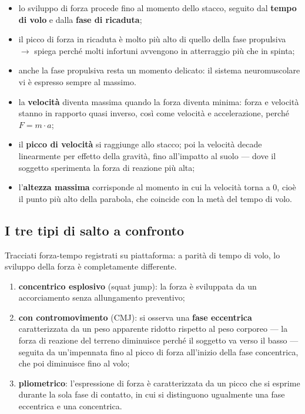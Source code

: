 \begin{itemize}
  \item lo sviluppo di forza procede fino al momento dello stacco, seguito dal \textbf{tempo di
    volo} e dalla \textbf{fase di ricaduta};
  \item il picco di forza in ricaduta è molto più alto di quello della fase propulsiva $\rightarrow$
    spiega perché molti infortuni avvengono in atterraggio più che in spinta;
  \item anche la fase propulsiva resta un momento delicato: il sistema neuromuscolare vi è espresso
    sempre al massimo.
\end{itemize}

\begin{itemize}
  \item la \textbf{velocità} diventa massima quando la forza diventa minima: forza e velocità stanno
    in rapporto quasi inverso, così come velocità e accelerazione, perché $F = m \cdot a$;
  \item il \textbf{picco di velocità} si raggiunge allo stacco; poi la velocità decade linearmente
    per effetto della gravità, fino all'impatto al suolo --- dove il soggetto sperimenta la forza di
    reazione più alta;
  \item l'\textbf{altezza massima} corrisponde al momento in cui la velocità torna a $0$, cioè il
    punto più alto della parabola, che coincide con la metà del tempo di volo.
\end{itemize}

\subsection{I tre tipi di salto a confronto}

Tracciati forza-tempo registrati su piattaforma: a parità di tempo di volo, lo sviluppo della forza
è completamente differente.

\begin{enumerate}
  \item \textbf{concentrico esplosivo} (squat jump): la forza è sviluppata da un accorciamento senza
    allungamento preventivo;
  \item \textbf{con contromovimento} (CMJ): si osserva una \textbf{fase eccentrica} caratterizzata
    da un peso apparente ridotto rispetto al peso corporeo --- la forza di reazione del terreno
    diminuisce perché il soggetto va verso il basso --- seguita da un'impennata fino al picco di
    forza all'inizio della fase concentrica, che poi diminuisce fino al volo;
  \item \textbf{pliometrico}: l'espressione di forza è caratterizzata da un picco che si esprime
    durante la sola fase di contatto, in cui si distinguono ugualmente una fase eccentrica
    e una concentrica.
\end{enumerate}


